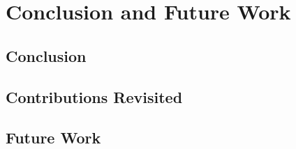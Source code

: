 \chapter{Conclusion and Future Work}

\section{Conclusion}
\section{Contributions Revisited}
\section{Future Work}
